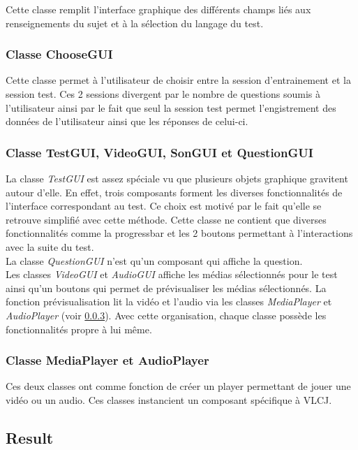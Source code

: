 Cette classe remplit l'interface graphique des différents champs liés aux renseignements du sujet et à la sélection du langage du test. 

\subsubsection{Classe ChooseGUI}

Cette classe permet à l'utilisateur de choisir entre la session d'entrainement et la session test. Ces 2 sessions divergent par le nombre de questions soumis à l'utilisateur ainsi par le fait que seul la session test permet l'engistrement des données de l'utilisateur ainsi que les réponses de celui-ci.

\subsubsection{Classe TestGUI, VideoGUI, SonGUI et QuestionGUI}

La classe \textit{TestGUI} est assez spéciale vu que plusieurs objets graphique gravitent autour d'elle. En effet, trois composants forment les diverses fonctionnalités de l'interface correspondant au test. Ce choix est motivé par le fait qu'elle se retrouve simplifié avec cette méthode. Cette classe ne contient que diverses fonctionnalités comme la progressbar et les 2 boutons permettant à l'interactions avec la suite du test.\\
La classe \textit{QuestionGUI} n'est qu'un composant qui affiche la question.\\
Les classes \textit{VideoGUI} et \textit{AudioGUI} affiche les médias sélectionnés pour le test ainsi qu'un boutons qui permet de prévisualiser les médias sélectionnés. La fonction prévisualisation lit la vidéo et l'audio via les classes \textit{MediaPlayer} et \textit{AudioPlayer} (voir \ref{players}).
Avec cette organisation, chaque classe possède les fonctionnalités propre à lui même.

\subsubsection{Classe MediaPlayer et AudioPlayer}\label{players}

Ces deux classes ont comme fonction de créer un player permettant de jouer une vidéo ou un audio. Ces classes instancient un composant spécifique à VLCJ. 

\subsection{Result}\label{Archi_Results}

